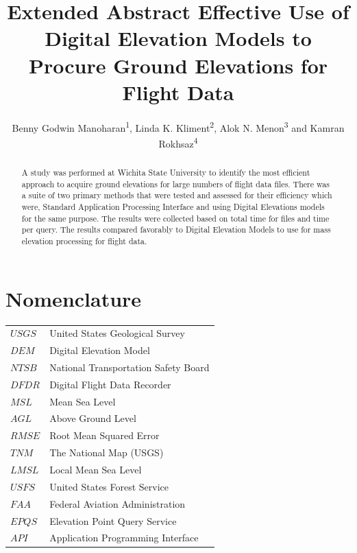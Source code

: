 \documentclass[conf]{new-aiaa}
\title{Extended Abstract
Effective Use of Digital Elevation Models to Procure Ground Elevations for Flight Data}
\author{Benny Godwin Manoharan\textsuperscript{1}, Linda K. Kliment\textsuperscript{2}, Alok N. Menon\textsuperscript{3} and Kamran Rokhsaz\textsuperscript{4}}
\affil{Wichita State University, Wichita, KS 67260-0042, USA}
\begin{document}
\maketitle

\begin{abstract}
A study was performed at Wichita State University to identify the most efficient approach to acquire ground elevations for large numbers of flight data files. There was a suite of two primary methods that were tested and assessed for their efficiency which were, Standard Application Processing Interface and using Digital Elevations models for the same purpose. The results were collected based on total time for files and time per query. The results compared favorably to Digital Elevation Models to use for mass elevation processing for flight data.
\end{abstract}

\section{Nomenclature}
{\renewcommand\arraystretch{1.0}
\noindent\begin{longtable*}{@{}l @{\quad=\quad} l@{}}
$USGS$ & United States Geological Survey \\
$DEM$ & Digital Elevation Model \\
$NTSB$ & National Transportation Safety Board \\
$DFDR$ & Digital Flight Data Recorder \\
$MSL$ & Mean Sea Level  \\
$AGL$ & Above Ground Level \\
$RMSE$ & Root Mean Squared Error \\
$TNM$ & The National Map (USGS) \\
$LMSL$ & Local Mean Sea Level \\
$USFS$ & United States Forest Service \\
$FAA$ & Federal Aviation Administration \\
$EPQS$ & Elevation Point Query Service \\
$API$ & Application Programming Interface
\end{longtable*}}
\end{document}
